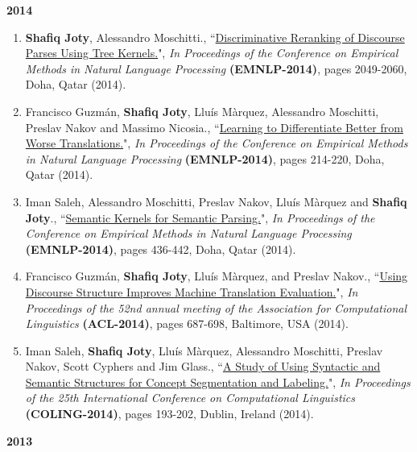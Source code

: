 \documentclass[paper=letter,fontsize=11pt]{scrartcl} %
\newcommand{\PaperEntry}[7]{
		\noindent #1, ``\href{#7}{#2}", \textit{#3} \textbf{#4}, #5 (#6).}
\begin{document}
\Large \textbf{2014} \normalsize

\begin{enumerate}
\item \PaperEntry{\textbf{Shafiq Joty}, Alessandro Moschitti.}{Discriminative Reranking of Discourse Parses Using Tree Kernels.}{In Proceedings of the Conference on Empirical Methods in Natural Language Processing} {(EMNLP-2014)}{pages 2049-2060, Doha, Qatar}{2014}
{http://emnlp2014.org/papers/pdf/EMNLP2014219.pdf}

\item \PaperEntry{Francisco Guzmán, \textbf{Shafiq Joty}, Lluís Màrquez, Alessandro Moschitti, Preslav Nakov and Massimo Nicosia.}{Learning to Differentiate Better from Worse Translations.}{In Proceedings of the Conference on Empirical Methods in Natural Language Processing} {(EMNLP-2014)}{pages 214-220, Doha, Qatar}{2014}
{http://aclweb.org/anthology/D/D14/D14-1027.pdf}

\item \PaperEntry{Iman Saleh, Alessandro Moschitti, Preslav Nakov, Lluís Màrquez and \textbf{Shafiq Joty}.}{Semantic Kernels for Semantic Parsing.}{In Proceedings of the Conference on Empirical Methods in Natural Language Processing} {(EMNLP-2014)}{pages 436-442, Doha, Qatar}{2014}
{http://qcri.org.qa/app/media/4849}

\item \PaperEntry{Francisco Guzmán, \textbf{Shafiq Joty}, Lluís Màrquez, and Preslav Nakov.}{Using Discourse Structure Improves Machine Translation Evaluation.}{In Proceedings of the 52nd annual meeting of the Association for Computational Linguistics} {(ACL-2014)}{pages 687-698, Baltimore, USA}{2014}
{http://qcri.org.qa/app/media/4865}

\item \PaperEntry{Iman Saleh, \textbf{Shafiq Joty}, Lluís Màrquez, Alessandro Moschitti, Preslav Nakov, Scott Cyphers and Jim Glass.}{A Study of Using Syntactic and Semantic Structures for Concept Segmentation and Labeling.}{In Proceedings of the 25th International Conference on Computational Linguistics} {(COLING-2014)}{pages 193-202, Dublin, Ireland}{2014}
{http://anthology.aclweb.org/C/C14/C14-1020.pdf}
\end{enumerate}


\Large \textbf{2013} \normalsize
\end{document}
